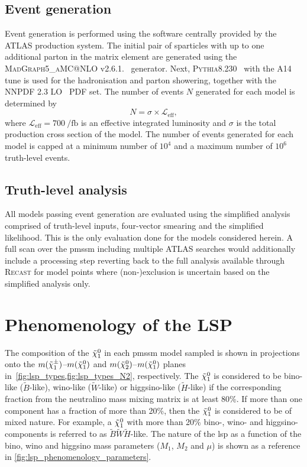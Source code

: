 \subsection{Event generation}

Event generation is performed using the software centrally provided by the ATLAS production system. The initial pair of sparticles with up to one additional parton in the matrix element are generated using the \textsc{MadGraph5\_aMC@NLO} v2.6.1.~\cite{MGaMCNLO:2014hca,Frederix:2012ps} generator. Next, \textsc{Pythia8.230}~\cite{Pythia8:2007gs}  with the \textsc{A14}~\cite{ATL-PHYS-PUB-2014-021} tune is used for the hadronisation and parton showering, together with the NNPDF 2.3 LO~\cite{Ball:2012cx} \gls{PDF} set. The number of events $N$ generated for each model is determined by
\begin{equation}
	N = \sigma \times \mathcal{L}_\mathrm{eff},
\end{equation}
where $\mathcal{L}_\mathrm{eff} = \SI{700}{\per\femto\barn}$ is an effective integrated luminosity and $\sigma$ is the total production cross section of the model. The number of events generated for each model is capped at a minimum number of $10^4$ and a maximum number of $10^6$ truth-level events.

\subsection{Truth-level analysis}

All models passing event generation are evaluated using the simplified analysis comprised of truth-level inputs, four-vector smearing and the simplified likelihood. This is the only evaluation done for the models considered herein. A full scan over the \gls{pmssm} including multiple ATLAS searches would additionally include a processing step reverting back to the full analysis available through \textsc{Recast} for model points where (non-)exclusion is uncertain based on the simplified analysis only.

\section{Phenomenology of the LSP}\label{sec:lsp_pheno}

The composition of the $\tilde{\chi}_1^0$ in each \gls{pmssm} model sampled is shown in projections onto the \mbox{$m(\tilde{\chi}_1^\pm)$--$m(\tilde{\chi}_1^0)$} and \mbox{$m(\tilde{\chi}_2^0)$--$m(\tilde{\chi}_1^0)$} planes in~\cref{fig:lsp_types,fig:lsp_types_N2}, respectively. The $\tilde{\chi}_1^0$ is considered to be bino-like ($\tilde{B}$-like), wino-like ($\tilde{W}$-like) or higgsino-like ($\tilde{H}$-like) if the corresponding fraction from the neutralino mass mixing matrix is at least 80\%. If more than one component has a fraction of more than 20\%, then the $\tilde{\chi}_1^0$ is considered to be of mixed nature. For example, a $\tilde{\chi}_1^0$ with more than 20\% bino-, wino- and higgsino-components is referred to as $\tilde{B}\tilde{W}\tilde{H}$-like. The nature of the \gls{lsp} as a function of the bino, wino and higgsino mass parameters ($M_1$, $M_2$ and $\mu$) is shown as a reference in \cref{fig:lsp_phenomenology_parameters}. 

